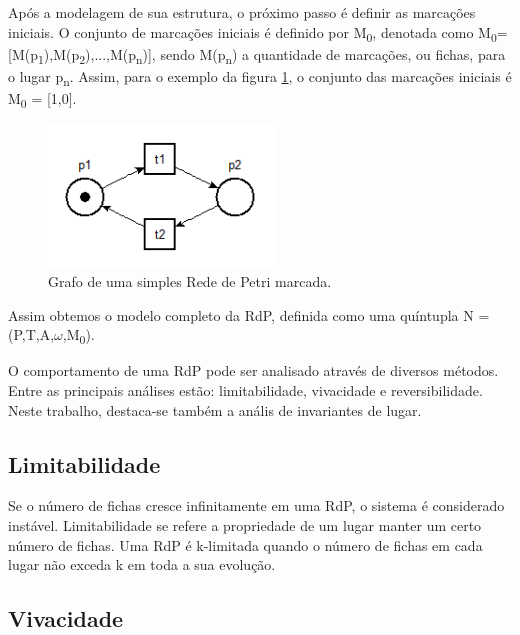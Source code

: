 Ap\'os a modelagem de sua estrutura, o pr\'oximo passo \'e definir as marca\c{c}\~oes iniciais. O conjunto de marca\c{c}\~oes iniciais \'e definido por M\textsubscript{0}, denotada como M\textsubscript{0}=[M(p\textsubscript{1}),M(p\textsubscript{2}),...,M(p\textsubscript{n})], sendo M(p\textsubscript{n}) a quantidade de marca\c{c}\~oes, ou fichas, para o lugar p\textsubscript{n}.
Assim, para o exemplo da figura \ref{fig:rdpsimplesmarcada}, o conjunto das marca\c{c}\~oes iniciais \'e M\textsubscript{0} = [1,0].

\begin{figure}[!htb]
	\caption[Grafo de uma simples Rede de Petri marcada]{Grafo de uma simples Rede de Petri marcada.}
	\label{fig:rdpsimplesmarcada}
	\includegraphics[width=6cm]{./figuras/RDP_SIMPLES_MARCADA.png}\centering
\end{figure}

Assim obtemos o modelo completo da RdP, definida como uma qu\'intupla N = (P,T,A,$\omega$,M\textsubscript{0}).

O comportamento de uma RdP pode ser analisado atrav\'es de diversos m\'etodos. Entre as principais an\'alises est\~ao: limitabilidade, vivacidade e reversibilidade. Neste trabalho, destaca-se tamb\'em a an\'alis de invariantes de lugar.

\subsection{Limitabilidade}

Se o n\'umero de fichas cresce infinitamente em uma RdP, o sistema \'e considerado inst\'avel. Limitabilidade se refere a propriedade de um lugar manter um certo n\'umero de fichas. Uma RdP \'e k-limitada quando o n\'umero de fichas em cada lugar n\~ao exceda k em toda a sua evolu\c{c}\~ao.

\subsection{Vivacidade}

